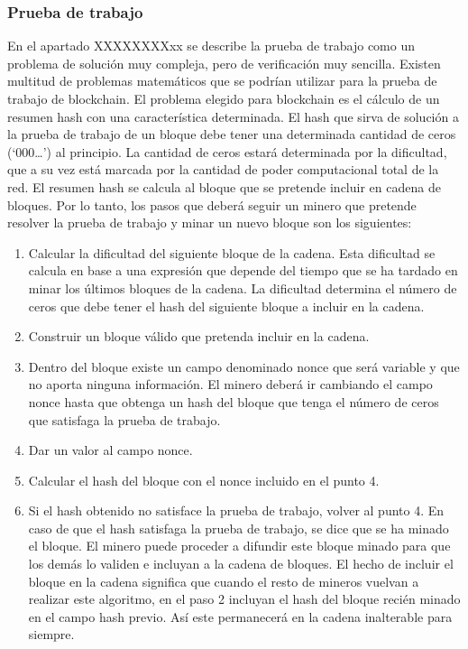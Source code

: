 \subsubsection{Prueba de trabajo}
En el apartado XXXXXXXXxx se describe la prueba de trabajo como un problema de solución muy compleja, pero de verificación muy sencilla. Existen multitud de problemas matemáticos que se podrían utilizar para la prueba de trabajo de blockchain. El problema elegido para blockchain es el cálculo de un resumen hash con una característica determinada. El hash que sirva de solución a la prueba de trabajo de un bloque debe tener una determinada cantidad de ceros (‘000…’) al principio. La cantidad de ceros estará determinada por la dificultad, que a su vez está marcada por la cantidad de poder computacional total de la red. El resumen hash se calcula al bloque que se pretende incluir en cadena de bloques.
Por lo tanto, los pasos que deberá seguir un minero que pretende resolver la prueba de trabajo y minar un nuevo bloque son los siguientes:
\begin{enumerate}
	\item Calcular la dificultad del siguiente bloque de la cadena. Esta dificultad se calcula en base a una expresión que depende del tiempo que se ha tardado en minar los últimos bloques de la cadena. La dificultad determina el número de ceros que debe tener el hash del siguiente bloque a incluir en la cadena.
	\item Construir un bloque válido que pretenda incluir en la cadena.
	\item Dentro del bloque existe un campo denominado nonce que será variable y que no aporta ninguna información. El minero deberá ir cambiando el campo nonce hasta que obtenga un hash del bloque que tenga el número de ceros que satisfaga la prueba de trabajo.
	\item Dar un valor al campo nonce.
	\item Calcular el hash del bloque con el nonce incluido en el punto 4.
	\item Si el hash obtenido no satisface la prueba de trabajo, volver al punto 4. En caso de que el hash satisfaga la prueba de trabajo, se dice que se ha minado el bloque. El minero puede proceder a difundir este bloque minado para que los demás lo validen e incluyan a la cadena de bloques. El hecho de incluir el bloque en la cadena significa que cuando el resto de mineros vuelvan a realizar este algoritmo, en el paso 2 incluyan el hash del bloque recién minado en el campo hash previo. Así este permanecerá en la cadena inalterable para siempre.
\end{enumerate}


